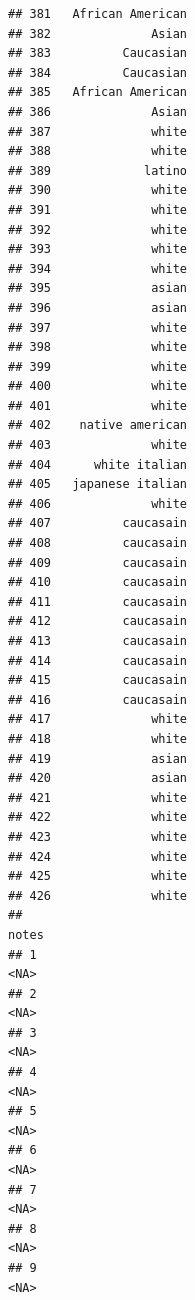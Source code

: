 \documentclass[]{article}
\begin{document}
\begin{verbatim}
## 381   African American
## 382              Asian
## 383          Caucasian
## 384          Caucasian
## 385   African American
## 386              Asian
## 387              white
## 388              white
## 389             latino
## 390              white
## 391              white
## 392              white
## 393              white
## 394              white
## 395              asian
## 396              asian
## 397              white
## 398              white
## 399              white
## 400              white
## 401              white
## 402    native american
## 403              white
## 404      white italian
## 405   japanese italian
## 406              white
## 407          caucasain
## 408          caucasain
## 409          caucasain
## 410          caucasain
## 411          caucasain
## 412          caucasain
## 413          caucasain
## 414          caucasain
## 415          caucasain
## 416          caucasain
## 417              white
## 418              white
## 419              asian
## 420              asian
## 421              white
## 422              white
## 423              white
## 424              white
## 425              white
## 426              white
##                                                                                                                                                   notes
## 1                                                                                                                                                  <NA>
## 2                                                                                                                                                  <NA>
## 3                                                                                                                                                  <NA>
## 4                                                                                                                                                  <NA>
## 5                                                                                                                                                  <NA>
## 6                                                                                                                                                  <NA>
## 7                                                                                                                                                  <NA>
## 8                                                                                                                                                  <NA>
## 9                                                                                                                                                  <NA>

\end{verbatim}
\end{document}
